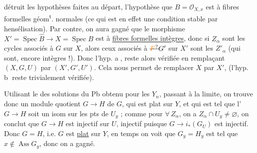 
détruit les hypothèses  faites au départ,  
l'hypothèse que $B=\mathcal O_{X,x}$ est à fibres formelles
géom\textsuperscript{t}. normales (ce qui est en effet une
condition stable par hensélisation). Par contre,
on aura gagné que le morphisme $X'=\operatorname{Spec}\widehat B\to X=\operatorname{Spec}B$ est
à \uline{fibres formelles  intègres}, donc si $Z_\alpha$ sont les
cycles associés à $G$ sur $X$,  alors  ceux
associés à $\deleted{\unsure{F}}G'$ sur $X'$ sont les $Z'_\alpha$ (qui sont,
encore intègres !). Donc l'hyp. \textcircled{a},  reste alors vérifiée
en remplaçant $(X,G,U)$ par $(X',G',U')$. Cela nous
permet de remplacer $X$ par $X'$, (l'hyp. \textcircled{b} reste
trivialement vérifiée).

Utilisant le  des solutions
du Pb obtenu pour les $Y_n$,  passant à la
limite, on trouve donc un module quotient
$G\to H$ de $G$, qui est plat sur $Y$,  et qui est
tel que l' $G\to H$ soit  un isom sur les
pts de $U_y$ ; comme pour $\forall\,Z_\alpha$, on a $Z_\alpha\cap U_y\ne\varnothing$,
on conclut que $G\to H$ est injectif sur $U$, 
injectif puisque $G\to i_*(G_U)$ est injectif. Donc
$G=H$, i.e. $G$ est \uline{plat} sur $Y$, en \unsure{$=$} temps on
voit que $G_y=H_y$ est tel que $x\notin\operatorname{Ass}G_y$, donc
on a gagné.

